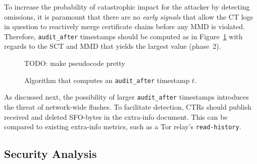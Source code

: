 To increase the probability of catastrophic impact for the attacker by detecting
omissions, it is paramount that there are no \emph{early signals} that
allow the CT logs in question to reactively merge certificate chains before
any MMD is violated.  Therefore, \texttt{audit\_after} timestamps should be
computed as in Figure~\ref{fig:audit-after} with regards to the SCT and MMD that
yields the largest value (phase~2).

\begin{figure}
	\centering
	TODO: make pseudocode pretty
	\caption{%
		Algorithm that computes an \texttt{audit\_after} timestamp $t$.
	}
	\label{fig:audit-after}
\end{figure}

As discussed next, the possibility of larger \texttt{audit\_after} timestamps
introduces the threat of network-wide flushes.  To facilitate detection, CTRs
should publish received and deleted SFO-bytes in the extra-info document.  This
can be compared to existing extra-info metrics, such as a Tor relay's
\texttt{read-history}.

\subsection{Security Analysis}
